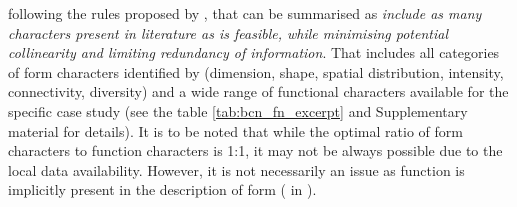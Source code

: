 following the rules proposed by \cite{sneath1973numerical}, that can be summarised as
\emph{include as many characters present in literature as is feasible, while minimising
potential collinearity and limiting redundancy of information}. That includes all
categories of form characters identified by \cite{fleischmann2020measuring} (dimension,
shape, spatial distribution, intensity, connectivity, diversity) and a wide range of
functional characters available for the specific case study (see the table
\ref{tab:bcn_fn_excerpt} and Supplementary material for details). It is to be noted that
while the optimal ratio of form characters to function characters is 1:1, it may not be
always possible due to the local data availability. However, it is not necessarily an
issue as function is implicitly present in the description of form
(\cite{caniggia2001architectural} in \cite{kropf2009aspects}).

